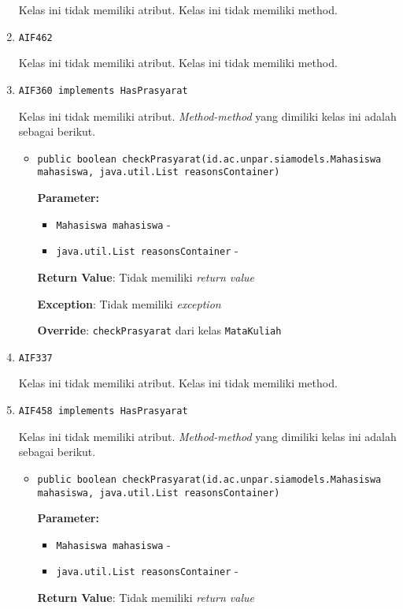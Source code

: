\documentclass{article}
\begin{document}
\begin{enumerate}
Kelas ini tidak memiliki atribut. Kelas ini tidak memiliki method. \item \texttt{AIF462}



Kelas ini tidak memiliki atribut. Kelas ini tidak memiliki method. \item \texttt{AIF360 implements HasPrasyarat}



Kelas ini tidak memiliki atribut. \textit{Method-method} yang dimiliki kelas ini adalah sebagai berikut.
\begin{itemize}
\item \texttt{public boolean checkPrasyarat(id.ac.unpar.siamodels.Mahasiswa mahasiswa, java.util.List reasonsContainer)}



\textbf{Parameter:}
\begin{itemize}
\item \texttt{Mahasiswa mahasiswa} - 
\item \texttt{java.util.List reasonsContainer} - 
\end{itemize}
\textbf{Return Value}: Tidak memiliki \textit{return value}

\textbf{Exception}: Tidak memiliki \textit{exception}

\textbf{Override}: \texttt{checkPrasyarat} dari kelas \texttt{MataKuliah}

\end{itemize}
\item \texttt{AIF337}



Kelas ini tidak memiliki atribut. Kelas ini tidak memiliki method. \item \texttt{AIF458 implements HasPrasyarat}



Kelas ini tidak memiliki atribut. \textit{Method-method} yang dimiliki kelas ini adalah sebagai berikut.
\begin{itemize}
\item \texttt{public boolean checkPrasyarat(id.ac.unpar.siamodels.Mahasiswa mahasiswa, java.util.List reasonsContainer)}



\textbf{Parameter:}
\begin{itemize}
\item \texttt{Mahasiswa mahasiswa} - 
\item \texttt{java.util.List reasonsContainer} - 
\end{itemize}
\textbf{Return Value}: Tidak memiliki \textit{return value}


\end{itemize}
\end{enumerate}
\end{document}
